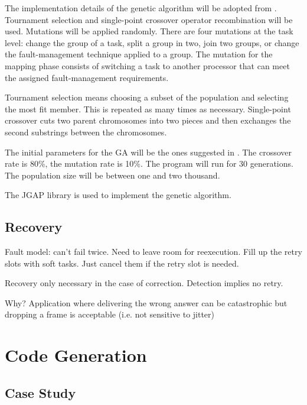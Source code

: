 \documentclass[table,11pt]{article}
\begin{document}
The implementation details of the genetic algorithm will be adopted from \cite{bolchini2013reliability}. Tournament selection and single-point crossover operator recombination will be used. Mutations will be applied randomly. There are four mutations at the task level: change the group of a task, split a group in two, join two groups, or change the fault-management technique applied to a group. The mutation for the mapping phase consists of switching a task to another processor that can meet the assigned fault-management requirements.

Tournament selection means choosing a subset of the population and selecting the most fit member. This is repeated as many times as necessary. Single-point crossover cuts two parent chromosomes into two pieces and then exchanges the second substrings between the chromosomes. 

The initial parameters for the GA will be the ones suggested in \cite{bolchini2010multi}. The crossover rate is 80\%, the mutation rate is 10\%. The program will run for 30 generations. The population size will be between one and two thousand.

The JGAP library \cite{jgap} is used to implement the genetic algorithm. 

\subsection{Recovery}
Fault model: can't fail twice.
Need to leave room for reexecution. 
Fill up the retry slots with soft tasks. Just cancel them if the retry slot is needed.

Recovery only necessary in the case of correction. Detection implies no retry. 

Why? Application where delivering the wrong answer can be catastrophic but dropping a frame is acceptable (i.e. not sensitive to jitter)



\section{Code Generation}

\subsection{Case Study}
\end{document}
